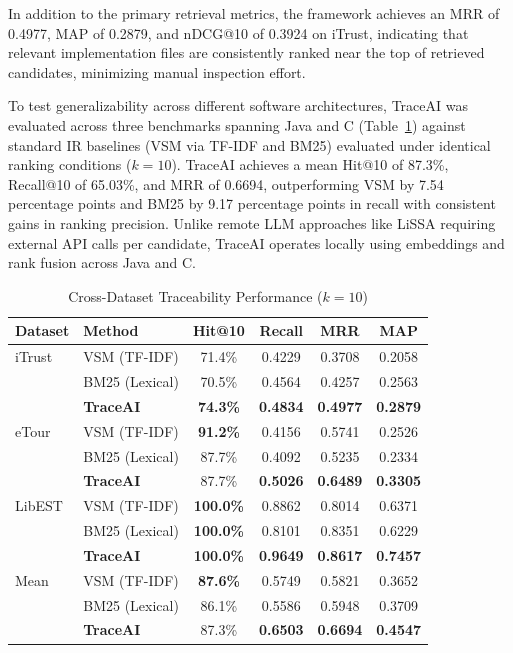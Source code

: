 \documentclass[conference]{IEEEtran}
\renewcommand{\arraystretch}{1.15}
\begin{document}
In addition to the primary retrieval metrics, the framework achieves an MRR of 0.4977, MAP of 0.2879, and nDCG@10 of 0.3924 on iTrust, indicating that relevant implementation files are consistently ranked near the top of retrieved candidates, minimizing manual inspection effort.

To test generalizability across different software architectures, TraceAI was evaluated across three benchmarks spanning Java and C (Table~\ref{tab:baseline_comparison}) against standard IR baselines (VSM via TF-IDF and BM25) evaluated under identical ranking conditions ($k=10$). TraceAI achieves a mean Hit@10 of 87.3\%, Recall@10 of 65.03\%, and MRR of 0.6694, outperforming VSM by 7.54 percentage points and BM25 by 9.17 percentage points in recall with consistent gains in ranking precision. Unlike remote LLM approaches like LiSSA \cite{ref8} requiring external API calls per candidate, TraceAI operates locally using embeddings and rank fusion across Java and C.

\begin{table}[H]
\centering
\caption{Cross-Dataset Traceability Performance ($k=10$)}
\label{tab:baseline_comparison}
\footnotesize
\setlength{\tabcolsep}{3.8pt}
\renewcommand{\arraystretch}{1.05}
\begin{tabular}{@{}llcccc@{}}
\toprule
\textbf{Dataset} & \textbf{Method} & \textbf{Hit@10} & \textbf{Recall} & \textbf{MRR} & \textbf{MAP} \\
\midrule
iTrust & VSM (TF-IDF) & 71.4\% & 0.4229 & 0.3708 & 0.2058 \\
 & BM25 (Lexical) & 70.5\% & 0.4564 & 0.4257 & 0.2563 \\
 & \textbf{TraceAI} & \textbf{74.3\%} & \textbf{0.4834} & \textbf{0.4977} & \textbf{0.2879} \\
\midrule
eTour & VSM (TF-IDF) & \textbf{91.2\%} & 0.4156 & 0.5741 & 0.2526 \\
 & BM25 (Lexical) & 87.7\% & 0.4092 & 0.5235 & 0.2334 \\
 & \textbf{TraceAI} & 87.7\% & \textbf{0.5026} & \textbf{0.6489} & \textbf{0.3305} \\
\midrule
LibEST & VSM (TF-IDF) & \textbf{100.0\%} & 0.8862 & 0.8014 & 0.6371 \\
 & BM25 (Lexical) & \textbf{100.0\%} & 0.8101 & 0.8351 & 0.6229 \\
 & \textbf{TraceAI} & \textbf{100.0\%} & \textbf{0.9649} & \textbf{0.8617} & \textbf{0.7457} \\
\midrule
Mean & VSM (TF-IDF) & \textbf{87.6\%} & 0.5749 & 0.5821 & 0.3652 \\
 & BM25 (Lexical) & 86.1\% & 0.5586 & 0.5948 & 0.3709 \\
 & \textbf{TraceAI} & 87.3\% & \textbf{0.6503} & \textbf{0.6694} & \textbf{0.4547} \\
\bottomrule
\end{tabular}
\end{table}
\end{document}
